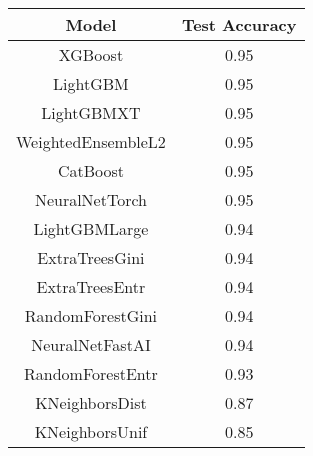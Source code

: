 \footnotesize
\begin{tabular}{cc}
\toprule
Model & Test Accuracy \\
\midrule
XGBoost & 0.95 \\
LightGBM & 0.95 \\
LightGBMXT & 0.95 \\
WeightedEnsembleL2 & 0.95 \\
CatBoost & 0.95 \\
NeuralNetTorch & 0.95 \\
LightGBMLarge & 0.94 \\
ExtraTreesGini & 0.94 \\
ExtraTreesEntr & 0.94 \\
RandomForestGini & 0.94 \\
NeuralNetFastAI & 0.94 \\
RandomForestEntr & 0.93 \\
KNeighborsDist & 0.87 \\
KNeighborsUnif & 0.85 \\
\bottomrule
\end{tabular}

\normalsize